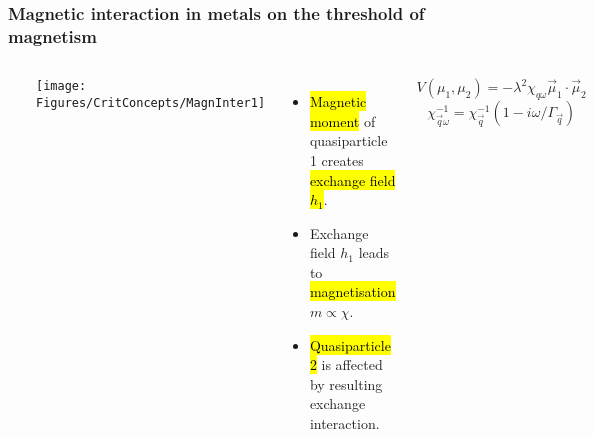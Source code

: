 \begin{frame}[label=MagnInter]
\frametitle{Magnetic interaction in metals on the threshold of magnetism}

\begin{columns}[t]
\centerline{~}
\centerline{\texttt{[image: \\Figures/CritConcepts/MagnInter1]}}
\begin{itemize}
\item<2->
\hl{Magnetic moment} of quasiparticle 1 creates \hl{exchange field $h_1$}.

\item<3->
Exchange field $h_1$ leads to \hl{magnetisation} $m \propto \chi$. 

\item<4->
\hl{Quasiparticle 2} is affected by resulting exchange interaction.
\end{itemize}

\centerline{}
\[V(\mu_1, \mu_2) = -\lambda^2 \chi_{q\omega} \vec\mu_1 \cdot \vec\mu_2\]
\[\chi_{\vec q \omega}^{-1} = \chi_\vec q^{-1} \left(1-i\omega/\Gamma_\vec q\right) \]

\end{columns}

\end{frame}


